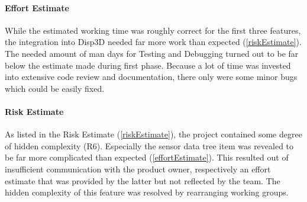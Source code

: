 \paragraph{Effort Estimate}

While the estimated working time was roughly correct for the first three features, the integration into Disp3D needed far more work than expected (\ref{riskEstimate}).\\
The needed amount of man days for Testing and Debugging turned out to be far below the estimate made during first phase. Because a lot of time was invested into extensive code review and documentation, there only were some minor bugs which could be easily fixed.


\paragraph{Risk Estimate}

As listed in the Risk Estimate (\ref{riskEstimate}), the project contained some degree of hidden complexity (R6). Especially the sensor data tree item was revealed to be far more complicated than expected (\ref{effortEstimate}). This resulted out of insufficient communication with the product owner, respectively an effort estimate that was provided by the latter but not reflected by the team. The hidden complexity of this feature was resolved by rearranging working groups.
